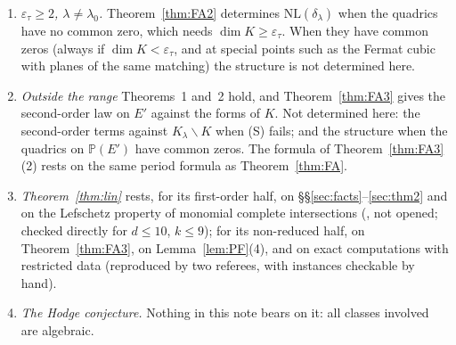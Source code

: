 \documentclass[11pt]{article}
\numberwithin{equation}{section}
\theoremstyle{remark}
\newcommand{\PP}{\mathbb{P}}
\newcommand{\NL}{\mathrm{NL}}
\newcommand{\lz}{\lambda_0}
\newcommand{\et}{\varepsilon_\tau}
\begin{document}
\begin{enumerate}
\item \emph{$\et\ge2$, $\lambda\ne\lz$.} Theorem~\ref{thm:FA2} determines $\NL(\delta_\lambda)$ when the quadrics
have no common zero, which needs $\dim K\ge\et$. When they have common zeros (always if $\dim K<\et$, and at
special points such as the Fermat cubic with planes of the same matching) the structure is not determined here.
\item \emph{Outside the range} Theorems~1 and~2 hold, and Theorem~\ref{thm:FA3} gives the second-order law on
$E'$ against the forms of $K$. Not determined here: the second-order terms against $K_\lambda\smallsetminus K$
when (S) fails; and the structure when the quadrics on $\PP(E')$ have common zeros. The
formula of Theorem~\ref{thm:FA3}(2) rests on the same period formula as Theorem~\ref{thm:FA}.
\item \emph{Theorem~\ref{thm:lin}} rests, for its first-order half, on \S\S\ref{sec:facts}--\ref{sec:thm2} and on
the Lefschetz property of monomial complete intersections (\cite{St,Wa}, not opened; checked directly for
$d\le10$, $k\le9$); for its non-reduced half,
on Theorem~\ref{thm:FA3}, on Lemma~\ref{lem:PF}(4), and on exact computations with restricted data (reproduced by two referees,
with instances checkable by hand).
\item \emph{The Hodge conjecture.} Nothing in this note bears on it: all classes involved are algebraic.
\end{enumerate}
\end{document}
